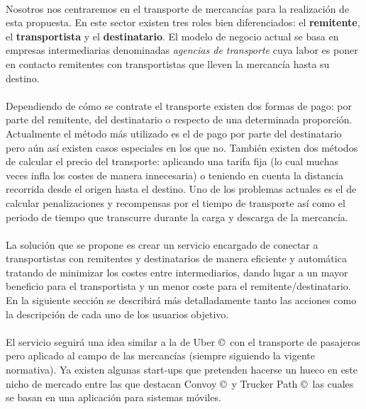 \documentclass[10pt, a4paper,spanish]{article}
\begin{document}
			\paragraph{}
			Nosotros nos centraremos en el transporte de mercancías para la realización de esta propuesta. En este sector existen tres roles bien diferenciados: el \textbf{remitente}, el \textbf{transportista} y el \textbf{destinatario}. El modelo de negocio actual se basa en empresas intermediarias denominadas \textit{agencias de transporte} cuya labor es poner en contacto remitentes con transportistas que lleven la mercancía hasta su destino.

			\paragraph{}
			Dependiendo de cómo se contrate el transporte existen dos formas de pago: por parte del remitente, del destinatario o respecto de una determinada proporción. Actualmente el método más utilizado es el de pago por parte del destinatario pero aún así existen casos especiales en los que no. También existen dos métodos de calcular el precio del transporte: aplicando una tarifa fija (lo cual muchas veces infla los costes de manera innecesaria) o teniendo en cuenta la distancia recorrida desde el origen hasta el destino. Uno de los problemas actuales es el de calcular penalizaciones y recompensas por el tiempo de transporte así como el periodo de tiempo que transcurre durante la carga y descarga de la mercancía.

			\paragraph{}
			La solución que se propone es crear un servicio encargado de conectar a transportistas con remitentes y destinatarios de manera eficiente y automática tratando de minimizar los costes entre intermediarios, dando lugar a un mayor beneficio para el transportista y un menor coste para el remitente/destinatario. En la siguiente sección se describirá más detalladamente tanto las acciones como la descripción de cada uno de los usuarios objetivo.

			\paragraph{}
			El servicio seguirá una idea similar a la de Uber \copyright\  con el transporte de pasajeros pero aplicado al campo de las mercancías (siempre siguiendo la vigente normativa). Ya existen algunas start-ups que pretenden hacerse un hueco en este nicho de mercado entre las que destacan Convoy \copyright\ y Trucker Path \copyright\ las cuales se basan en una aplicación para sistemas móviles. \cite{expansion_uber_transporte}
\end{document}
